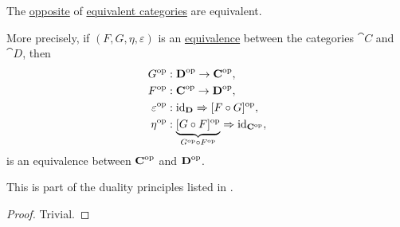\begin{proposition}\label{thm:opposite_of_category_equivalence}
  The \hyperref[def:opposite_category]{opposite} of \hyperref[def:category_equivalence]{equivalent categories} are equivalent.

  More precisely, if \( (F, G, \eta, \varepsilon) \) is an \hyperref[def:category_equivalence]{equivalence} between the categories \( \cat{C} \) and \( \cat{D} \), then
  \begin{equation*}
    \begin{aligned}
                G^{\opcat} &: \cat{D}^{\opcat} \to \cat{C}^{\opcat}, \\
                F^{\opcat} &: \cat{C}^{\opcat} \to \cat{D}^{\opcat}, \\
      \varepsilon^{\opcat} &: \id_{\cat{D}} \Rightarrow [F \bincirc G]^{\opcat}, \\
             \eta^{\opcat} &: \underbrace{[G \bincirc F]^{\opcat}}_{G^{\opcat} \bincirc F^{\opcat}} \Rightarrow \id_{\cat{C}^{\opcat}},
    \end{aligned}
  \end{equation*}
  is an equivalence between \( \operatorname{\mathbf{C}}^{\operatorname{op}} \) and \( \operatorname{\mathbf{D}}^{\operatorname{op}} \).

  This is part of the duality principles listed in .
\end{proposition}
\begin{proof}
  Trivial.
\end{proof}


